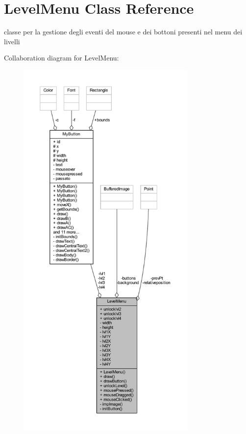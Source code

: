 \hypertarget{classui_1_1_level_menu}{}\section{Level\+Menu Class Reference}
\label{classui_1_1_level_menu}


classe per la gestione degli eventi del mouse e dei bottoni presenti nel menu dei livelli  




Collaboration diagram for Level\+Menu\+:\nopagebreak
\begin{figure}[H]
\begin{center}
\leavevmode
\includegraphics[height=550pt]{classui_1_1_level_menu__coll__graph}
\end{center}
\end{figure}
